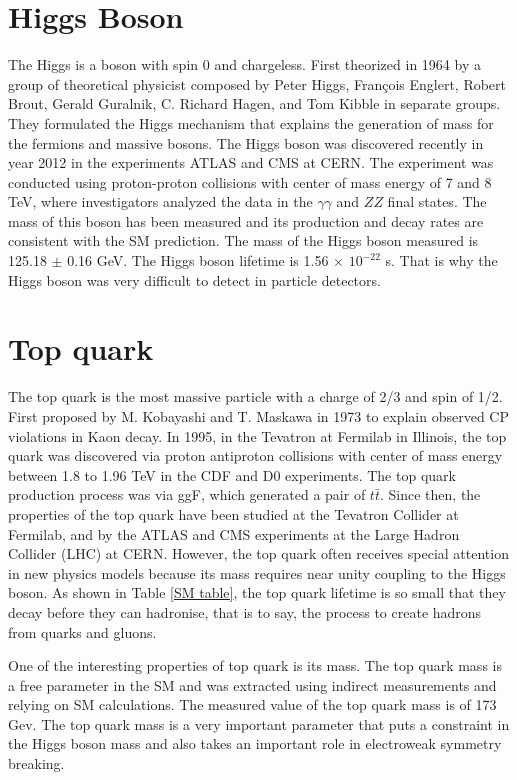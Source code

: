 \newpage

\section{Higgs Boson}
The Higgs is a boson with spin 0 and chargeless. First theorized in 1964 by a group of theoretical physicist composed by Peter Higgs, Fran\c cois Englert, Robert Brout, Gerald Guralnik, C. Richard Hagen, and Tom Kibble in separate groups. They formulated the Higgs mechanism that explains the generation of mass for the fermions and massive bosons. 
The Higgs boson was discovered recently in year 2012 in the experiments ATLAS and CMS at CERN. The experiment was conducted using proton-proton collisions with center of mass energy of 7 and 8 TeV, where investigators analyzed the data in the $\gamma \gamma$ and $ZZ$ final states\cite{higgsd,Aad_2012}. 
The mass of this boson has been measured and its production and decay
rates are consistent with the SM prediction. The mass of the Higgs boson measured is 125.18 $\pm$ 0.16 GeV\cite{pd}. The Higgs boson lifetime is 1.56 $\times$ $10^{-22}$ s. That is why the Higgs boson was very difficult to detect in particle detectors. 

\section{Top quark}
The top quark is the most massive particle with a charge of 2/3 and spin of 1/2. First proposed by M. Kobayashi and T. Maskawa in 1973 to explain observed CP violations in Kaon decay\cite{griff}. In 1995, in the Tevatron at Fermilab in Illinois, the top quark was discovered via proton antiproton collisions with center of mass energy between 1.8 to 1.96 TeV in the CDF and D0 experiments. The top quark production process was via ggF, which generated a pair of $t\bar{t}$\cite{top}.
Since then, the properties of the top quark have been studied at the Tevatron Collider at Fermilab, and by the ATLAS and CMS experiments at the Large Hadron Collider (LHC) at CERN.
However, the top quark often receives special attention in new physics models because its mass requires near unity coupling to the Higgs boson\cite{top}.
As shown in Table \ref{SM table}, the top quark lifetime is so small that they decay before they can hadronise, that is to say, the process to create hadrons from quarks and gluons.

One of the interesting properties of top quark is its mass.
The top quark mass is a free parameter in the SM and was extracted using indirect measurements and relying on SM calculations. The measured value of the top quark mass is of 173 Gev\cite{pd}. The top quark mass is a very important
parameter that puts a constraint in the Higgs boson mass and also takes an important role in electroweak symmetry breaking\cite{top}.

